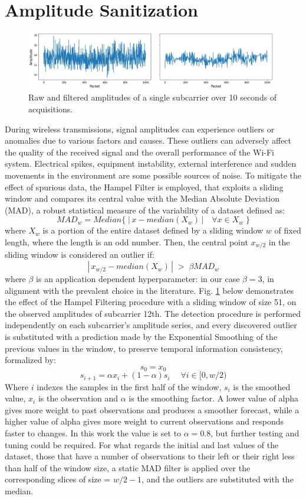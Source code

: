 \documentclass[binding=0.7cm, oneside]{sapthesis}
\begin{document}
\section{Amplitude Sanitization}
\label{sec:amp_san}
\begin{figure}[b]
    \centering
    \includegraphics[width=0.98\textwidth]{images/hampel_DWT.png}
    \caption{Raw and filtered amplitudes of a single subcarrier over 10 seconds of acquisitions.}
    \label{fig:Hampel1}
\end{figure}
During wireless transmissions, signal amplitudes can experience outliers or anomalies due to various factors and causes. These outliers can adversely
affect the quality of the received signal and the overall performance of the Wi-Fi system. Electrical spikes, equipment instability, external interference and
sudden movements in the environment are some possible sources of noise. To mitigate the effect of spurious data, the Hampel Filter \cite{hampel_ID, Gait_hampel_pca} is employed,
that exploits a sliding window and compares its central value with the Median Absolute Deviation (MAD), a robust statistical measure of the variability of a dataset defined as:
$$ MAD_{w} = Median\{\;|\,x - median(X_{w})\,|\quad \forall x \in X_{w}\;\} $$
where $X_{w}$ is a portion of the entire dataset defined by a sliding window $w$ of fixed length, where the length is an odd number. Then, the central point $x_{w/2}$ in the sliding window
is considered an outlier if:
$$|\,x_{w/2} - median(X_{w})\,|\; >\; \beta MAD_{w}$$
where $\beta$ is an application dependent hyperparameter: in our case $\beta = 3$, in alignment with the prevalent choice in the literature. Fig. \ref{fig:Hampel1} below
demonstrates the effect of the Hampel Filtering procedure with a sliding window of size 51, on the observed amplitudes of subcarrier 12th.
The detection procedure is performed independently on each subcarrier’s amplitude series, and every discovered outlier is substituted
with a prediction made by the Exponential Smoothing of the previous values in the window, to preserve temporal information consistency, formalized by:
$$s_0 = x_0$$
$$ s_{i+1} = \alpha x_i + (1-\alpha)s_i \quad \; \forall i \in [0,w/2)$$
Where $i$ indexes the samples in the first half of the window, $s_i$ is the smoothed value, $x_i$ is the observation and $\alpha$ is the smoothing factor.
A lower value of alpha gives more weight to past observations and produces a smoother forecast, while a higher value of alpha gives more weight to current observations and responds faster to changes.
In this work the value is set to $\alpha = 0.8$, but further testing and tuning could be required. For what regards the initial and last values of the dataset,
those that have a number of observations to their left or their right less than half of the window size, a static MAD filter is applied over the corresponding slices of size = $w/2 - 1$, and the outliers are substituted with the median.
\end{document}
